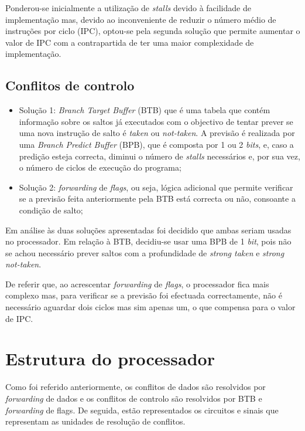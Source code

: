 \documentclass[11pt]{article}
\numberwithin{equation}{section}
\begin{document}
Ponderou-se inicialmente a utilização de \textit{stalls} devido à facilidade de implementação mas, devido ao inconveniente de reduzir o número médio de instruções por ciclo (IPC), optou-se pela segunda solução que permite aumentar o valor de IPC com a contrapartida de ter uma maior complexidade de implementação.

\subsection{Conflitos de controlo}

\begin{itemize}
	\item Solução 1: \textit{Branch Target Buffer} (BTB) que é uma tabela que contém informação sobre os saltos já executados com o objectivo de tentar prever se uma nova instrução de salto é \textit{taken} ou \textit{not-taken}. A previsão é realizada por uma \textit{Branch Predict Buffer} (BPB), que é composta por 1 ou 2 \textit{bits}, e, caso a predição esteja correcta, diminui o número de \textit{stalls} necessários e, por sua vez, o número de ciclos de execução do programa;
	\vspace{-2.5mm}
	\item Solução 2: \textit{forwarding} de \textit{flags}, ou seja, lógica adicional que permite verificar se a previsão feita anteriormente pela BTB está correcta ou não, consoante a condição de salto;
	\vspace{-2.5mm}
\end{itemize}

Em análise às duas soluções apresentadas foi decidido que ambas seriam usadas no processador. Em relação à BTB, decidiu-se usar uma BPB de 1 \textit{bit}, pois não se achou necessário prever saltos com a profundidade de \textit{strong taken} e \textit{strong not-taken}.

De referir que, ao acrescentar \textit{forwarding} de \textit{flags}, o processador fica mais complexo mas, para verificar se a previsão foi efectuada correctamente, não é necessário aguardar dois ciclos mas sim apenas um, o que compensa para o valor de IPC.

\section{Estrutura do processador}

Como foi referido anteriormente, os conflitos de dados são resolvidos por \textit{forwarding} de dados e os conflitos de controlo são resolvidos por BTB e \textit{forwarding} de flags. De seguida, estão representados os circuitos e sinais que representam as unidades de resolução de conflitos.
\end{document}
